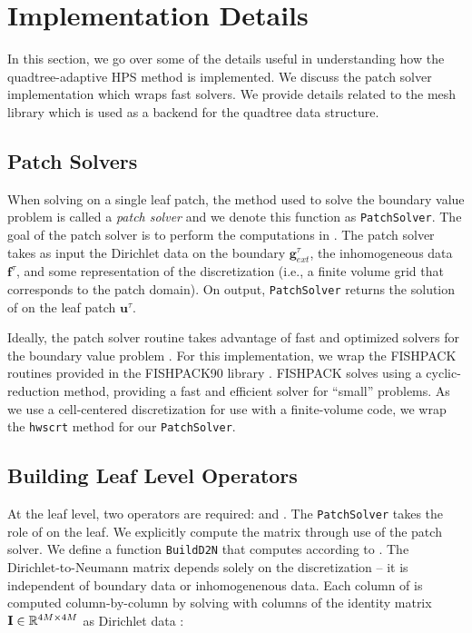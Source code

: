 \section{Implementation Details}
\label{sec:adaptivity}

In this section, we go over some of the details useful in understanding how the quadtree-adaptive HPS method is implemented. We discuss the patch solver implementation which wraps fast solvers. We provide details related to the mesh library \pforest which is used as a backend for the quadtree data structure.

\subsection{Patch Solvers}
\label{sub:patch_solvers}

When solving  on a single leaf patch, the method used to solve the boundary value problem is called a {\em patch solver} and we denote this function as \texttt{PatchSolver}. The goal of the patch solver is to perform the computations in . The patch solver takes as input the Dirichlet data on the boundary $\textbf{g}_{ext}^{\tau}$, the inhomogeneous data $\textbf{f}^{\tau}$, and some representation of the discretization (i.e., a finite volume grid that corresponds to the patch domain). On output, \texttt{PatchSolver} returns the solution of  on the leaf patch $\textbf{u}^{\tau}$.

Ideally, the patch solver routine takes advantage of fast and optimized solvers for the boundary value problem . For this implementation, we wrap the FISHPACK routines \cite{swarztrauber1999fishpack} provided in the FISHPACK90 library \cite{adams2016fishpack90}. FISHPACK solves  using a cyclic-reduction method, providing a fast and efficient solver for ``small'' problems. As we use a cell-centered discretization for use with a finite-volume code, we wrap the \texttt{hwscrt} method for our \texttt{PatchSolver}.

\subsection{Building Leaf Level Operators}

At the leaf level, two operators are required: \Stau and \Ttau. The \texttt{PatchSolver} takes the role of \Stau on the leaf. We explicitly compute the matrix \Ttau through use of the patch solver. We define a function \texttt{BuildD2N} that computes \Ttau according to . The Dirichlet-to-Neumann matrix depends solely on the discretization -- it is independent of boundary data or inhomogenenous data. Each column of \Ttau is computed column-by-column by solving  with columns of the identity matrix $\textbf{I} \in \mathbb R^{4M \times 4M}$ as Dirichlet data \gtau:

